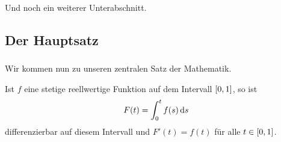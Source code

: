 \subsubsection{} 
%
Und noch ein weiterer Unterabschnitt.
%
\subsection{Der Hauptsatz}
\subsubsection{}
Wir kommen nun zu unseren zentralen Satz der Mathematik.
%
\begin{theorem}\label{thm:hauptsatz}
%	
Ist $ f $ eine stetige reellwertige Funktion auf dem Intervall\/ $ \left[ 0,1 \right] $, so ist
%
\[
  	F( t ) = \int_{ 0 }^{ t } f(s) \mathop{}\!\mathrm{d}{s}
\]
%
differenzierbar auf diesem Intervall und $ F'(t) = f(t) $ für alle $ t \in  \left[ 0,1 \right] $.
\end{theorem}
%
